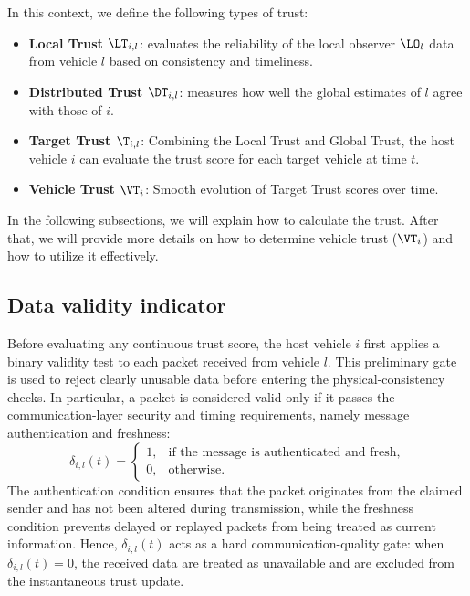 In this context, we define the following types of trust:
\begin{itemize}
    \item \textbf{Local Trust $\LT_{i,l}$}: evaluates the reliability of the local observer $\LO_{l}$ data from vehicle $l$ based on consistency and timeliness.
    \item \textbf{Distributed Trust $\DT_{i,l}$}: measures how well the global estimates of $l$ agree with those of $i$.
    \item \textbf{Target Trust $\T_{i,l}$}: Combining the Local Trust and Global Trust,  the host vehicle $i$ can evaluate the trust score for each target vehicle at time $t$.
    \item \textbf{Vehicle Trust $\VT_{i}$}: Smooth evolution of Target Trust scores over time.
\end{itemize}

In the following subsections, we will explain how to calculate the trust. After that, we will provide more details on how to determine vehicle trust ($\VT_{i}$) and how to utilize it effectively.
\vspace*{-0.3cm}
\subsection{Data validity indicator}
\vspace*{-0.3cm}

Before evaluating any continuous trust score, the host vehicle $i$ first applies a binary validity test to each packet received from vehicle $l$. This preliminary gate is used to reject clearly unusable data before entering the physical-consistency checks. In particular, a packet is considered valid only if it passes the communication-layer security and timing requirements, namely message authentication and freshness:
\begin{equation}
    \delta_{i,l}(t)=
    \begin{cases}
        1, & \text{if the message is authenticated and fresh}, \\
        0, & \text{otherwise.}
    \end{cases}
\end{equation}
The authentication condition ensures that the packet originates from the claimed sender and has not been altered during transmission, while the freshness condition prevents delayed or replayed packets from being treated as current information. Hence, $\delta_{i,l}(t)$ acts as a hard communication-quality gate: when $\delta_{i,l}(t)=0$, the received data are treated as unavailable and are excluded from the instantaneous trust update.

